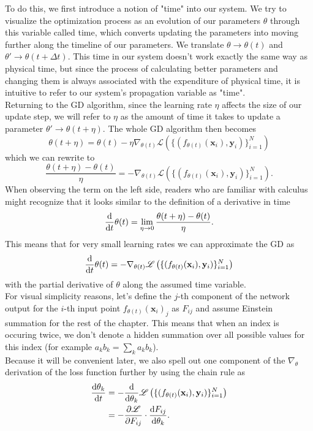 To do this, we first introduce a notion of "time" into our system. We try to visualize the optimization process as an evolution of our parameters $\theta$ through this variable called time, which converts updating the parameters into moving further along the timeline of our parameters. We translate $\theta \rightarrow \theta(t)$ and $\theta' \rightarrow \theta(t+\Delta t)$. This time in our system doesn't work exactly the same way as physical time, but since the process of calculating better parameters and changing them is always associated with the expenditure of physical time, it is intuitive to refer to our system's propagation variable as "time". \\
Returning to the GD algorithm, since the learning rate $\eta$ affects the size of our update step, we will refer to $\eta$ as the amount of time it takes to update a parameter $\theta' \rightarrow \theta(t+\eta)$. The whole GD algorithm then becomes
\begin{equation}
	\theta(t+\eta) = \theta(t) - \eta \nabla_{\theta(t)} \mathscr{L}\left( \{(f_{\theta(t)}(\mathbf{x}_i), \mathbf{y}_i)\}_{i=1}^{N} \right)
\end{equation}
which we can rewrite to 
\begin{equation}
	\frac{\theta(t+\eta)-\theta(t)}{\eta} = - \nabla_{\theta(t)} \mathscr{L}\left( \{(f_{\theta(t)}(\mathbf{x}_i), \mathbf{y}_i)\}_{i=1}^{N} \right).
\end{equation}
When observing the term on the left side, readers who are familiar with calculus might recognize that it looks similar to the definition of a derivative in time
\begin{equation}
	\frac{\mathrm{d}}{\mathrm{d}t}\theta(t) = \lim_{\eta\rightarrow0} \frac{\theta(t+\eta)-\theta(t)}{\eta}.
\end{equation}
This means that for very small learning rates we can approximate the GD as 
\begin{equation}\label{eq:NTKThetaDerivative}
	\frac{\mathrm{d}}{\mathrm{d}t}\theta(t) = - \nabla_{\theta(t)} \mathscr{L}\left( \{(f_{\theta(t)}(\mathbf{x}_i), \mathbf{y}_i)\}_{i=1}^{N} \right)
\end{equation}
with the partial derivative of $\theta$ along the assumed time variable.\\
For visual simplicity reasons, let's define the $j$-th component of the network output for the $i$-th input point $f_{\theta(t)}(\mathbf{x}_i)_j$ as $F_{ij}$ and assume Einstein summation for the rest of the chapter.
This means that when an index is occuring twice, we don't denote a hidden summation over all possible values for this index (for example $a_kb_k = \sum_k a_kb_k$).\\
Because it will be convenient later, we also spell out one component of the $\nabla_\theta$ derivation of the loss function further by using the chain rule as
\begin{align}
	\frac{\mathrm{d}\theta_k}{\mathrm{d}t} &= - \frac{\mathrm{d}}{\mathrm{d}\theta_k}\mathscr{L}\left( \{(f_{\theta(t)}(\mathbf{x}_i), \mathbf{y}_i)\}_{i=1}^{N} \right)\nonumber\\
	&= - \frac{\partial\mathscr{L}}{\partial F_{ij}} \cdot \frac{\mathrm{d}F_{ij}}{\mathrm{d}\theta_k}.
\end{align} 

